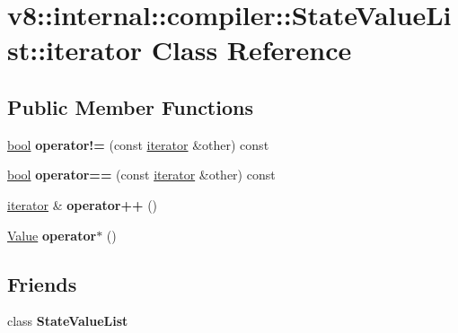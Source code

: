 \hypertarget{classv8_1_1internal_1_1compiler_1_1StateValueList_1_1iterator}{}\section{v8\+:\+:internal\+:\+:compiler\+:\+:State\+Value\+List\+:\+:iterator Class Reference}
\label{classv8_1_1internal_1_1compiler_1_1StateValueList_1_1iterator}
\subsection*{Public Member Functions}
\begin{DoxyCompactItemize}
\item 
\mbox{\label{classv8_1_1internal_1_1compiler_1_1StateValueList_1_1iterator_aea6bb7e35a07b76a17c871ab69adb126}} 
\mbox{\hyperlink{classbool}{bool}} {\bfseries operator!=} (const \mbox{\hyperlink{classv8_1_1internal_1_1compiler_1_1StateValueList_1_1iterator}{iterator}} \&other) const
\item 
\mbox{\label{classv8_1_1internal_1_1compiler_1_1StateValueList_1_1iterator_a996e83bae9b8e558e19b19c9532951d7}} 
\mbox{\hyperlink{classbool}{bool}} {\bfseries operator==} (const \mbox{\hyperlink{classv8_1_1internal_1_1compiler_1_1StateValueList_1_1iterator}{iterator}} \&other) const
\item 
\mbox{\label{classv8_1_1internal_1_1compiler_1_1StateValueList_1_1iterator_adc840b8a8f857e951bc9e1561d0e972f}} 
\mbox{\hyperlink{classv8_1_1internal_1_1compiler_1_1StateValueList_1_1iterator}{iterator}} \& {\bfseries operator++} ()
\item 
\mbox{\label{classv8_1_1internal_1_1compiler_1_1StateValueList_1_1iterator_a37b8364cf482e3610aaeb81e243cd574}} 
\mbox{\hyperlink{structv8_1_1internal_1_1compiler_1_1StateValueList_1_1Value}{Value}} {\bfseries operator$\ast$} ()
\end{DoxyCompactItemize}
\subsection*{Friends}
\begin{DoxyCompactItemize}
\item 
\mbox{\label{classv8_1_1internal_1_1compiler_1_1StateValueList_1_1iterator_abed753cb90d573db66eda3452bbe6ab3}} 
class {\bfseries State\+Value\+List}
\end{DoxyCompactItemize}


